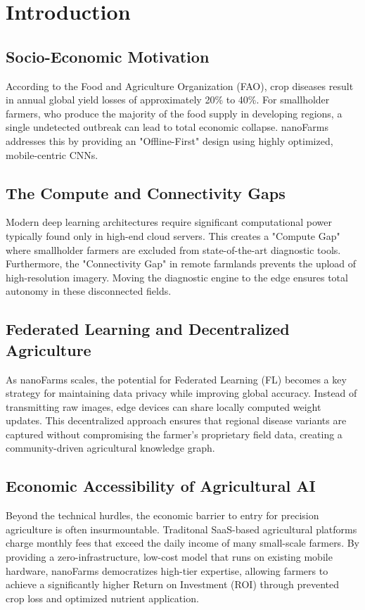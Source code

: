 \documentclass[11pt,onecolumn]{article}
\begin{document}
\newpage

\section{Introduction}

\subsection{Socio-Economic Motivation}
According to the Food and Agriculture Organization (FAO), crop diseases result in annual global yield losses of approximately 20\% to 40\%. For smallholder farmers, who produce the majority of the food supply in developing regions, a single undetected outbreak can lead to total economic collapse. nanoFarms addresses this by providing an "Offline-First" design using highly optimized, mobile-centric CNNs.

\subsection{The Compute and Connectivity Gaps}
Modern deep learning architectures require significant computational power typically found only in high-end cloud servers. This creates a "Compute Gap" where smallholder farmers are excluded from state-of-the-art diagnostic tools. Furthermore, the "Connectivity Gap" in remote farmlands prevents the upload of high-resolution imagery. Moving the diagnostic engine to the edge ensures total autonomy in these disconnected fields.

\subsection{Federated Learning and Decentralized Agriculture}
As nanoFarms scales, the potential for Federated Learning (FL) becomes a key strategy for maintaining data privacy while improving global accuracy. Instead of transmitting raw images, edge devices can share locally computed weight updates. This decentralized approach ensures that regional disease variants are captured without compromising the farmer's proprietary field data, creating a community-driven agricultural knowledge graph.

\subsection{Economic Accessibility of Agricultural AI}
Beyond the technical hurdles, the economic barrier to entry for precision agriculture is often insurmountable. Traditonal SaaS-based agricultural platforms charge monthly fees that exceed the daily income of many small-scale farmers. By providing a zero-infrastructure, low-cost model that runs on existing mobile hardware, nanoFarms democratizes high-tier expertise, allowing farmers to achieve a significantly higher Return on Investment (ROI) through prevented crop loss and optimized nutrient application.
\end{document}
